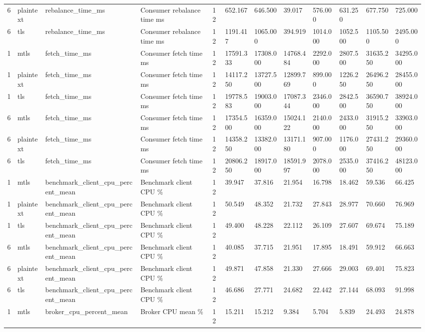 \begin{longtable}{llllllllllll}
6 & plaintext & rebalance\_time\_ms & Consumer rebalance time ms & 12 & 652.167 & 646.500 & 39.017 & 576.000 & 631.250 & 677.750 & 725.000 \\
6 & tls & rebalance\_time\_ms & Consumer rebalance time ms & 12 & 1191.417 & 1065.000 & 394.919 & 1014.000 & 1052.500 & 1105.500 & 2495.000 \\
1 & mtls & fetch\_time\_ms & Consumer fetch time ms & 12 & 17591.333 & 17308.000 & 14768.484 & 2292.000 & 2807.500 & 31635.250 & 34295.000 \\
1 & plaintext & fetch\_time\_ms & Consumer fetch time ms & 12 & 14117.250 & 13727.500 & 12899.769 & 899.000 & 1226.250 & 26496.250 & 28455.000 \\
1 & tls & fetch\_time\_ms & Consumer fetch time ms & 12 & 19778.583 & 19003.000 & 17087.344 & 2346.000 & 2842.500 & 36590.750 & 38924.000 \\
6 & mtls & fetch\_time\_ms & Consumer fetch time ms & 12 & 17354.500 & 16359.000 & 15024.122 & 2140.000 & 2433.000 & 31915.250 & 33903.000 \\
6 & plaintext & fetch\_time\_ms & Consumer fetch time ms & 12 & 14358.250 & 13382.000 & 13171.180 & 907.000 & 1176.000 & 27431.250 & 29360.000 \\
6 & tls & fetch\_time\_ms & Consumer fetch time ms & 12 & 20806.250 & 18917.000 & 18591.997 & 2078.000 & 2535.000 & 37416.250 & 48123.000 \\
1 & mtls & benchmark\_client\_cpu\_percent\_mean & Benchmark client CPU \% & 12 & 39.947 & 37.816 & 21.954 & 16.798 & 18.462 & 59.536 & 66.425 \\
1 & plaintext & benchmark\_client\_cpu\_percent\_mean & Benchmark client CPU \% & 12 & 50.549 & 48.352 & 21.732 & 27.843 & 28.977 & 70.660 & 76.969 \\
1 & tls & benchmark\_client\_cpu\_percent\_mean & Benchmark client CPU \% & 12 & 49.400 & 48.228 & 22.112 & 26.109 & 27.607 & 69.674 & 75.189 \\
6 & mtls & benchmark\_client\_cpu\_percent\_mean & Benchmark client CPU \% & 12 & 40.085 & 37.715 & 21.951 & 17.895 & 18.491 & 59.912 & 66.663 \\
6 & plaintext & benchmark\_client\_cpu\_percent\_mean & Benchmark client CPU \% & 12 & 49.871 & 47.858 & 21.330 & 27.666 & 29.003 & 69.401 & 75.823 \\
6 & tls & benchmark\_client\_cpu\_percent\_mean & Benchmark client CPU \% & 12 & 46.686 & 27.771 & 24.682 & 22.442 & 27.144 & 68.093 & 91.998 \\
1 & mtls & broker\_cpu\_percent\_mean & Broker CPU mean \% & 12 & 15.211 & 15.212 & 9.384 & 5.704 & 5.839 & 24.493 & 24.878 \\

\end{longtable}
